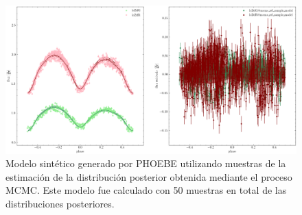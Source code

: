 \begin{figure}[!ht]
	\centering
	\includegraphics[scale=0.45]{Metodologia/Secciones/ModeloComputacional/Figures/Figura MCMC ZTF Modelo.png}
	\caption{Modelo sintético generado por PHOEBE utilizando muestras de la
	estimación de la distribución posterior obtenida mediante el proceso MCMC.
	Este modelo fue calculado con 50 muestras en total de las distribuciones
	posteriores.}
	\label{figuraMcmcZtfModeloDispersionPosterior}
\end{figure}